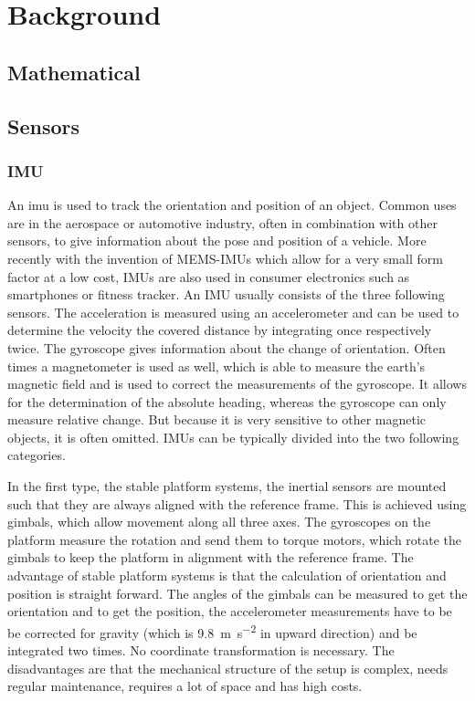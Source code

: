 \chapter{Background}
\label{ch:Background}
\section{Mathematical}

\section{Sensors}
\subsection{IMU}
An \gls{imu} is used to track the orientation and position of an object. 
Common uses are in the aerospace or automotive industry, often in combination with other sensors, to give information about the pose and position of a vehicle. 
More recently with the invention of MEMS-IMUs  which allow for a very small form factor at a low cost, IMUs are also used in consumer electronics such as smartphones or fitness tracker. 
An IMU usually consists of the three following sensors.
The acceleration is measured using an accelerometer and can be used to determine the velocity the covered distance by integrating once respectively twice.
The gyroscope gives information about the change of orientation. 
Often times a magnetometer is used as well, which is able to measure the earth's magnetic field and is used to correct the measurements of the gyroscope. It allows for the determination of the absolute heading, whereas the gyroscope can only measure relative change. But because it is very sensitive to other magnetic objects, it is often omitted.
IMUs can be typically divided into the two following categories.

In the first type, the stable platform systems, the inertial sensors are mounted such that they are always aligned with the reference frame.
This is achieved using gimbals, which allow movement along all three axes. 
The gyroscopes on the platform measure the rotation and send them to torque motors, which rotate the gimbals to keep the platform in alignment with the reference frame. 
The advantage of stable platform systems is that the calculation of orientation and position is straight forward. 
The angles of the gimbals can be measured to get the orientation and to get the position, the accelerometer measurements have to be be corrected for gravity (which is \SI{9.8}{\metre\per\second^2} in upward direction) and be integrated two times.
No coordinate transformation is necessary.
The disadvantages are that the mechanical structure of the setup is complex, needs regular maintenance, requires a lot of space and has high costs.


